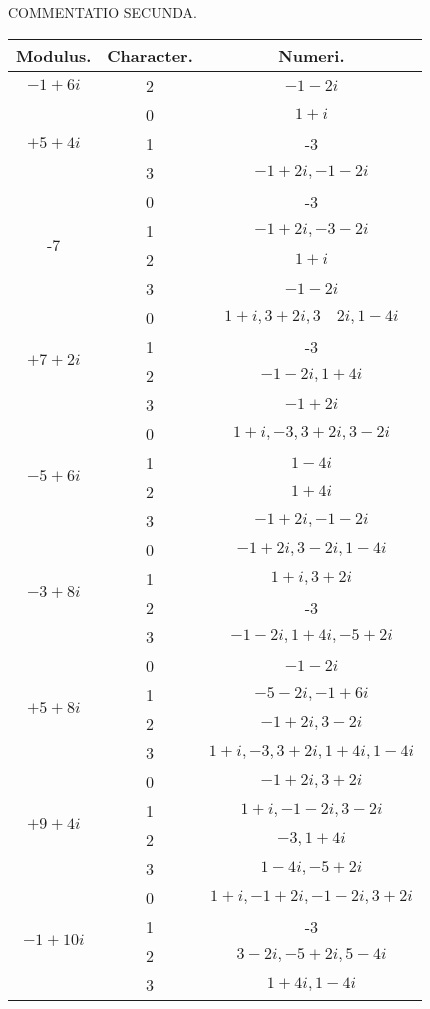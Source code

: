 \documentclass[10pt]{article}
\begin{document}
COMMENTATIO SECUNDA.

\begin{center}
\begin{tabular}{|c|c|c|}
\hline
Modulus. & Character. & Numeri. \\
\hline
\(-1+6 i\) & 2 & \(-1-2 i\) \\
\hline
\multirow{3}{*}{\(+5+4 i\)} & 0 & \(1+i\) \\
\hline
 & 1 & -3 \\
\hline
 & 3 & \(-1+2 i,-1-2 i\) \\
\hline
\multirow[t]{4}{*}{-7} & 0 & -3 \\
\hline
 & 1 & \(-1+2 i,-3-2 i\) \\
\hline
 & 2 & \(1+i\) \\
\hline
 & 3 & \(-1-2 i\) \\
\hline
\multirow[t]{4}{*}{\(+7+2 i\)} & 0 & \(1+i, 3+2 i, 3 \quad 2 i, 1-4 i\) \\
\hline
 & 1 & -3 \\
\hline
 & 2 & \(-1-2 i, 1+4 i\) \\
\hline
 & 3 & \(-1+2 i\) \\
\hline
\multirow{4}{*}{\(-5+6 i\)} & 0 & \(1+i,-3,3+2 i, 3-2 i\) \\
\hline
 & 1 & \(1-4 i\) \\
\hline
 & 2 & \(1+4 i\) \\
\hline
 & 3 & \(-1+2 i,-1-2 i\) \\
\hline
\multirow[t]{4}{*}{\(-3+8 i\)} & 0 & \(-1+2 i, 3-2 i, 1-4 i\) \\
\hline
 & 1 & \(1+i, 3+2 i\) \\
\hline
 & 2 & -3 \\
\hline
 & 3 & \(-1-2 i, 1+4 i,-5+2 i\) \\
\hline
\multirow[t]{4}{*}{\(+5+8 i\)} & 0 & \(-1-2 i\) \\
\hline
 & 1 & \(-5-2 i,-1+6 i\) \\
\hline
 & 2 & \(-1+2 i, 3-2 i\) \\
\hline
 & 3 & \(1+i,-3,3+2 i, 1+4 i, 1-4 i\) \\
\hline
\multirow[t]{4}{*}{\(+9+4 i\)} & 0 & \(-1+2 i, 3+2 i\) \\
\hline
 & 1 & \(1+i,-1-2 i, 3-2 i\) \\
\hline
 & 2 & \(-3,1+4 i\) \\
\hline
 & 3 & \(1-4 i,-5+2 i\) \\
\hline
\multirow[t]{4}{*}{\(-1+10 i\)} & 0 & \(1+i,-1+2 i,-1-2 i, 3+2 i\) \\
\hline
 & 1 & -3 \\
\hline
 & 2 & \(3-2 i,-5+2 i, 5-4 i\) \\
\hline
 & 3 & \(1+4 i, 1-4 i\) \\
\hline
\end{tabular}
\end{center}
\end{document}
